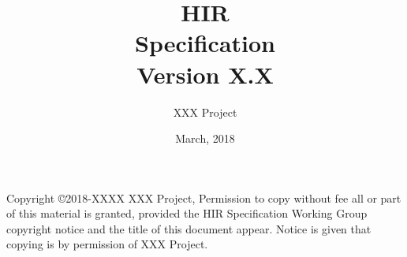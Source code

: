\documentclass[a4paper,10pt,twoside]{article}
\title{{\Huge HIR}\\
Specification\\
\vspace{2cm}
Version X.X\\ }
\author{
\Large XXX Project\\
}
\date{\vspace{4cm}\Large March, 2018}
\begin{document}
\maketitle

Copyright \copyright 2018-XXXX  XXX Project,
Permission to copy without fee all or part of this material is granted,
provided the HIR Specification Working Group copyright notice and the
title of this document appear. Notice is given that copying is by permission
of XXX Project.

\clearpage
%
\cleardoublepage

\tableofcontents
\listoffigures
\listoftables

%

\newpage
\mbox{}\newpage

\pagestyle{fancy}
\fancyhead{} %
\fancyhead[RE]{\leftmark}
\fancyhead[LO]{\rightmark}
\fancyhead[LE,RO]{\thepage}
\fancyfoot{} %
\renewcommand{\headrulewidth}{0pt}
\renewcommand{\footrulewidth}{0pt}



%
%
%
%
%
%
%
%
%

\cleardoublepage





\end{document}
